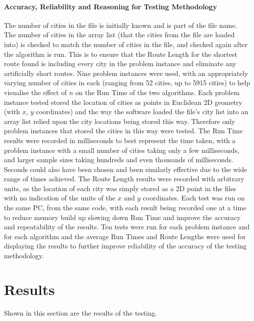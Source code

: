 \documentclass[conference,backref=page]{acmsiggraph}
\begin{document}
\paragraph{Accuracy, Reliability and Reasoning for Testing Methodology}
 The number of cities in the file is initially known and is part of the file name. The number of cities in the array list (that the cities from the file are loaded into) is checked to match the number of cities in the file, and checked again after the algorithm is run. This is to ensure that the Route Length for the shortest route found is including every city in the problem instance and eliminate any artificially short routes. Nine problem instances were used, with an appropriately varying number of cities in each (ranging from 52 cities, up to 5915 cities) to help visualise the effect of $n$ on the Run Time of the two algorithms. Each problem instance tested stored the location of cities as points in Euclidean 2D geometry (with $x$, $y$ coordinates) and the way the software loaded the file's city list into an array list relied upon the city locations being stored this way. Therefore only problem instances that stored the cities in this way were tested. The Run Time results were recorded in milliseconds to best represent the time taken, with a problem instance with a small number of cities taking only a few milliseconds, and larger sample sizes taking hundreds and even thousands of milliseconds. Seconds could also have been chosen and been similarly effective due to the wide range of times achieved. The Route Length results were recorded with arbitrary units, as the location of each city was simply stored as a 2D point in the files with no indication of the units of the $x$ and $y$ coordinates. Each test was run on the same PC, from the same code, with each result being recorded one at a time to reduce memory build up slowing down Run Time and improve the accuracy and repeatability of the results. Ten tests were run for each problem instance and for each algorithm and the average Run Times and Route Lengths were used for displaying the results to further improve reliability of the accuracy of the testing methodology.


\section{Results}
Shown in this section are the results of the testing.
\end{document}
